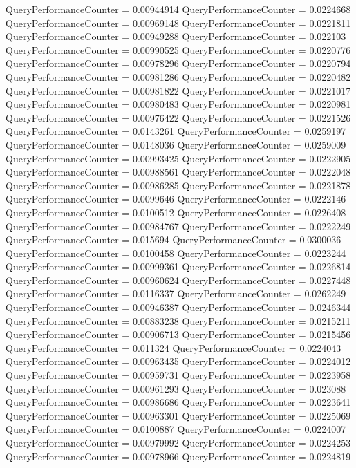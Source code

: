\documentclass[9pt]{article}
\theoremstyle{plain}
\theoremstyle{definition}
\theoremstyle{remark}
\numberwithin{equation}{section}
\begin{document}
QueryPerformanceCounter  =  0.00944914
QueryPerformanceCounter  =  0.0224668
QueryPerformanceCounter  =  0.00969148
QueryPerformanceCounter  =  0.0221811
QueryPerformanceCounter  =  0.00949288
QueryPerformanceCounter  =  0.022103
QueryPerformanceCounter  =  0.00990525
QueryPerformanceCounter  =  0.0220776
QueryPerformanceCounter  =  0.00978296
QueryPerformanceCounter  =  0.0220794
QueryPerformanceCounter  =  0.00981286
QueryPerformanceCounter  =  0.0220482
QueryPerformanceCounter  =  0.00981822
QueryPerformanceCounter  =  0.0221017
QueryPerformanceCounter  =  0.00980483
QueryPerformanceCounter  =  0.0220981
QueryPerformanceCounter  =  0.00976422
QueryPerformanceCounter  =  0.0221526
QueryPerformanceCounter  =  0.0143261
QueryPerformanceCounter  =  0.0259197
QueryPerformanceCounter  =  0.0148036
QueryPerformanceCounter  =  0.0259009
QueryPerformanceCounter  =  0.00993425
QueryPerformanceCounter  =  0.0222905
QueryPerformanceCounter  =  0.00988561
QueryPerformanceCounter  =  0.0222048
QueryPerformanceCounter  =  0.00986285
QueryPerformanceCounter  =  0.0221878
QueryPerformanceCounter  =  0.0099646
QueryPerformanceCounter  =  0.0222146
QueryPerformanceCounter  =  0.0100512
QueryPerformanceCounter  =  0.0226408
QueryPerformanceCounter  =  0.00984767
QueryPerformanceCounter  =  0.0222249
QueryPerformanceCounter  =  0.015694
QueryPerformanceCounter  =  0.0300036
QueryPerformanceCounter  =  0.0100458
QueryPerformanceCounter  =  0.0223244
QueryPerformanceCounter  =  0.00999361
QueryPerformanceCounter  =  0.0226814
QueryPerformanceCounter  =  0.00960624
QueryPerformanceCounter  =  0.0227448
QueryPerformanceCounter  =  0.0116337
QueryPerformanceCounter  =  0.0262249
QueryPerformanceCounter  =  0.00946387
QueryPerformanceCounter  =  0.0246344
QueryPerformanceCounter  =  0.00883238
QueryPerformanceCounter  =  0.0215211
QueryPerformanceCounter  =  0.00906713
QueryPerformanceCounter  =  0.0215456
QueryPerformanceCounter  =  0.011324
QueryPerformanceCounter  =  0.0224043
QueryPerformanceCounter  =  0.00963435
QueryPerformanceCounter  =  0.0224012
QueryPerformanceCounter  =  0.00959731
QueryPerformanceCounter  =  0.0223958
QueryPerformanceCounter  =  0.00961293
QueryPerformanceCounter  =  0.023088
QueryPerformanceCounter  =  0.00986686
QueryPerformanceCounter  =  0.0223641
QueryPerformanceCounter  =  0.00963301
QueryPerformanceCounter  =  0.0225069
QueryPerformanceCounter  =  0.0100887
QueryPerformanceCounter  =  0.0224007
QueryPerformanceCounter  =  0.00979992
QueryPerformanceCounter  =  0.0224253
QueryPerformanceCounter  =  0.00978966
QueryPerformanceCounter  =  0.0224819
\end{document}
